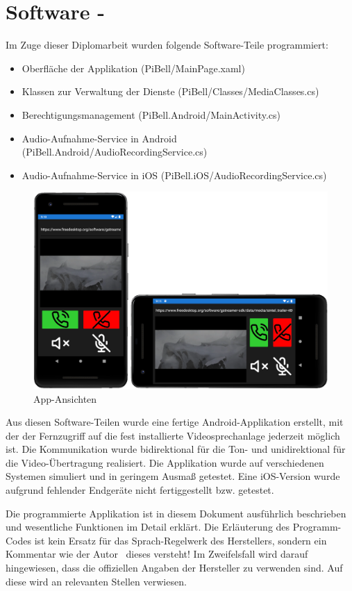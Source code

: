 \section{Software - \AndreasGrain}
Im Zuge dieser Diplomarbeit wurden folgende Software-Teile programmiert:
\begin{itemize}
    \item Oberfläche der Applikation (PiBell/MainPage.xaml)
    \item Klassen zur Verwaltung der Dienste (PiBell/Classes/MediaClasses.cs)
    \item Berechtigungsmanagement (PiBell.Android/MainActivity.cs)
    \item Audio-Aufnahme-Service in Android (PiBell.Android/AudioRecordingService.cs)
    \item Audio-Aufnahme-Service in iOS (PiBell.iOS/AudioRecordingService.cs)
\end{itemize}

\begin{figure}[htbp!]
    \centering
    \includegraphics[width=.9\linewidth]{images/projektergebnis/ansichtenFinaleApp.png}
    \caption{App-Ansichten}
\end{figure}

Aus diesen Software-Teilen wurde eine fertige Android-Applikation erstellt, mit der der Fernzugriff auf die fest installierte Videosprechanlage jederzeit möglich ist.
Die Kommunikation wurde bidirektional für die Ton- und unidirektional für die Video-Übertragung realisiert.
Die Applikation wurde auf verschiedenen Systemen simuliert und in geringem Ausmaß getestet.
Eine iOS-Version wurde aufgrund fehlender Endgeräte nicht fertiggestellt bzw. getestet.\par

Die programmierte Applikation ist in diesem Dokument ausführlich beschrieben und wesentliche Funktionen im Detail erklärt.
Die Erläuterung des Programm-Codes ist kein Ersatz für das Sprach-Regelwerk des Herstellers, sondern ein Kommentar wie der Autor \AndreasGrain\ dieses versteht!
Im Zweifelsfall wird darauf hingewiesen, dass die offiziellen Angaben der Hersteller zu verwenden sind.
Auf diese wird an relevanten Stellen verwiesen.

